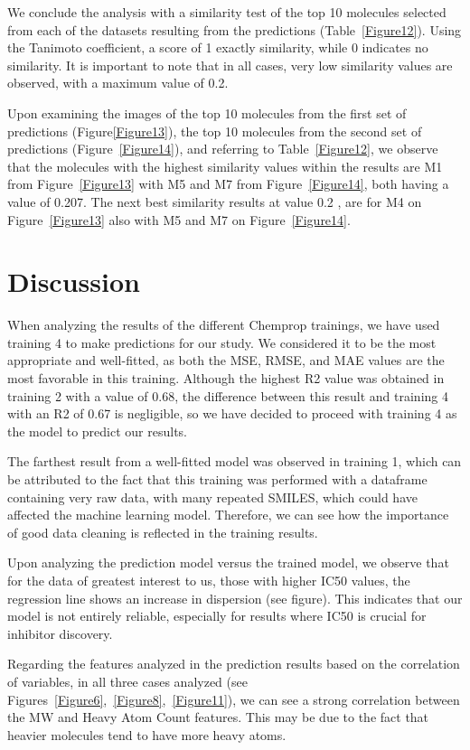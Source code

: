 \documentclass[final,times,twocolumn,article]{elsarticle}
\begin{document}
 We conclude the analysis with a similarity test of the top 10 molecules selected from each of the datasets resulting from the predictions (Table~\ref{Figure12}). Using the Tanimoto coefficient, a score of 1 exactly similarity, while 0 indicates no similarity. It is important to note that in all cases, very low similarity values are observed, with a maximum value of 0.2.

 Upon examining the images of the top 10 molecules from the first set of predictions (Figure{\ref{Figure13}}), the top 10 molecules from the second set of predictions (Figure~\ref{Figure14}), and referring to Table~\ref{Figure12}, we observe that the molecules with the highest similarity values within the results are M1 from Figure~\ref{Figure13} with M5 and M7 from Figure~\ref{Figure14}, both having a value of 0.207. The next best similarity results at value 0.2 , are for M4 on Figure~\ref{Figure13} also with M5 and M7 on Figure~\ref{Figure14}. 
 

\section{Discussion}

When analyzing the results of the different Chemprop trainings, we have used training 4 to make predictions for our study. We considered it to be the most appropriate and well-fitted, as both the MSE, RMSE, and MAE values are the most favorable in this training. Although the highest R2 value was obtained in training 2 with a value of 0.68, the difference between this result and training 4 with an R2 of 0.67 is negligible, so we have decided to proceed with training 4 as the model to predict our results.

The farthest result from a well-fitted model was observed in training 1, which can be attributed to the fact that this training was performed with a dataframe containing very raw data, with many repeated SMILES, which could have affected the machine learning model. Therefore, we can see how the importance of good data cleaning is reflected in the training results.

Upon analyzing the prediction model versus the trained model, we observe that for the data of greatest interest to us, those with higher IC50 values, the regression line shows an increase in dispersion (see figure). This indicates that our model is not entirely reliable, especially for results where IC50 is crucial for inhibitor discovery.

Regarding the features analyzed in the prediction results based on the correlation of variables, in all three cases analyzed (see Figures~\ref{Figure6},~\ref{Figure8},~\ref{Figure11}), we can see a strong correlation between the MW and Heavy Atom Count features. This may be due to the fact that heavier molecules tend to have more heavy atoms.
\end{document}
